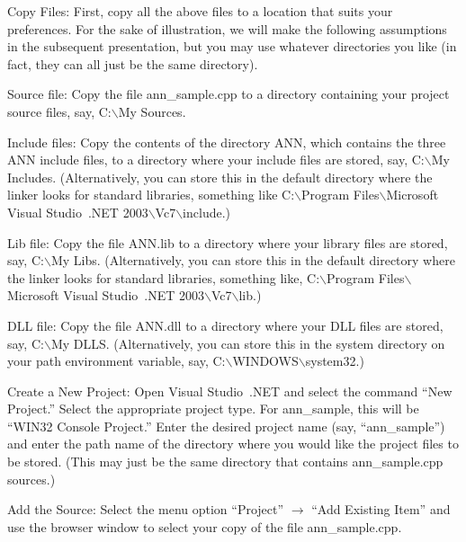 \documentclass[11pt]{article}		%
\newenvironment{description*}%
  {\begin{description}%
    \setlength{\itemsep}{-0.5ex}%
    \setlength{\parsep}{0pt}}%
  {\end{description}}
\newcommand{\ANN}[0]{\textsf{ANN}}
\newcommand{\annsample}[0]{\textsf{ann\_sample}}
\newcommand{\BSL}{\hbox{$\backslash$}}
\begin{document}
\begin{description*}
\item[Copy Files:] First, copy all the above files to a location that
	suits your preferences.  For the sake of illustration, we will make
	the following assumptions in the subsequent presentation, but you
	may use whatever directories you like (in fact, they can all just be
	the same directory).
	\begin{description*}
	\item[Source file:] Copy the file \textsf{ann\_sample.cpp} to a
		directory containing your project source files, say,
		\textsf{C:{\BSL}My Sources}.

	\item[Include files:] Copy the contents of the directory \textsf{ANN},
		which contains the three {\ANN} include files, to a directory
		where your include files are stored, say, \textsf{C:{\BSL}My
		Includes}.  (Alternatively, you can store this in the default
		directory where the linker looks for standard libraries,
		something like \textsf{C:{\BSL}Program Files{\BSL}Microsoft
		Visual Studio~.NET 2003{\BSL}Vc7{\BSL}include}.)

	\item[Lib file:] Copy the file \textsf{ANN.lib} 
		to a directory where your library files are stored, say,
		\textsf{C:{\BSL}My Libs}.  (Alternatively, you can store this
		in the default directory where the linker looks for standard
		libraries, something like,
		\textsf{C:{\BSL}Program Files{\BSL}Microsoft Visual Studio~.NET
		2003{\BSL}Vc7{\BSL}lib}.)

	\item[DLL file:] Copy the file \textsf{ANN.dll} to a directory where
		your DLL files are stored, say, \textsf{C:{\BSL}My DLLS}.
		(Alternatively, you can store this in the system directory on
		your path environment variable, say,
		\textsf{C:{\BSL}WINDOWS{\BSL}system32}.)
	\end{description*}

\item[Create a New Project:] Open Visual Studio~.NET and select the
	command ``New Project.''  Select the appropriate project type. For
	{\annsample}, this will be ``WIN32 Console Project.''  Enter the
	desired project name (say, ``{\annsample}'') and enter the path name
	of the directory where you would like the project files to be
	stored.  (This may just be the same directory that contains
	\textsf{ann\_sample.cpp} sources.)

\item[Add the Source:] Select the menu option ``Project'' $\rightarrow$
	``Add Existing Item'' and use the browser window to select your copy
	of the file \textsf{ann\_sample.cpp}.


\end{description*}
\end{document}
